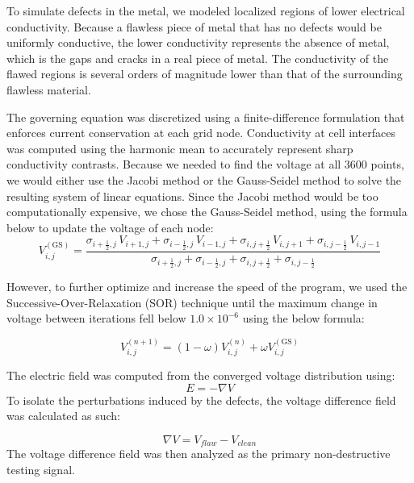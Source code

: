\documentclass[reprint,amsmath,amssymb,aps]{revtex4-2}
\begin{document}
To simulate defects in the metal, we modeled localized regions of lower electrical conductivity. Because a flawless piece of metal that has no defects would be uniformly conductive, the lower conductivity represents the absence of metal, which is the gaps and cracks in a real piece of metal. The conductivity of the flawed regions is several orders of magnitude lower than that of the surrounding flawless material. 

The governing equation was discretized using a finite-difference formulation that enforces current conservation at each grid node. Conductivity at cell interfaces was computed using the harmonic mean to accurately represent sharp conductivity contrasts. Because we needed to find the voltage at all 3600 points, we would either use the Jacobi method or the Gauss-Seidel method to solve the resulting system of linear equations. Since the Jacobi method would be too computationally expensive, we chose the Gauss-Seidel method, using the formula below to update the voltage of each node:
\vspace{0.5em}
\begin{equation} 
V_{i,j}^{(\mathrm{GS})} = \frac{\sigma_{i+\frac{1}{2},j} \, V_{i+1,j} + \sigma_{i-\frac{1}{2},j} \, V_{i-1,j} + \sigma_{i,j+\frac{1}{2}} \, V_{i,j+1} + \sigma_{i,j-\frac{1}{2}} \, V_{i,j-1}}{\sigma_{i+\frac{1}{2},j} + \sigma_{i-\frac{1}{2},j} + \sigma_{i,j+\frac{1}{2}} + \sigma_{i,j-\frac{1}{2}}}
\end{equation}
\label{Gauss-Seidel update formula}
\vspace{0.5em}

However, to further optimize and increase the speed of the program, we used the Successive-Over-Relaxation (SOR) technique until the maximum change in voltage between iterations fell below $1.0 \times 10^{-6}$ using the below formula:

\begin{equation}
    V_{i,j}^{(n+1)} = (1-\omega)V_{i,j}^{(n)} + \omega V_{i,j}^{(\mathrm{GS})}
\end{equation}
\vspace{0.5em}

The electric field was computed from the converged voltage distribution using:
\begin{equation}
    E = -\nabla V
\end{equation} \label{Electric field}
To isolate the perturbations induced by the defects, the voltage difference field was calculated as such:

\begin{equation} \nabla V = V_{flaw} - V_{clean} \end{equation}\label{Voltage difference field}
The voltage difference field was then analyzed as the primary non-destructive testing signal.
\end{document}
